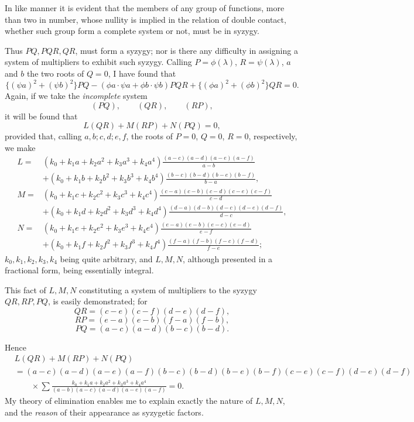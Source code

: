 \documentclass[11pt]{article}
\newcommand{\sourcepage}[1]{\marginpar{\scriptsize p.~#1}}
\begin{document}
In like manner it is evident that the members of any group of functions, more than two in number, whose nullity is implied in the relation of double contact, whether such group form a complete system or not, must be in syzygy.

Thus $PQ,PQR,QR$, must form a syzygy; nor is there any difficulty in assigning a system of multipliers to exhibit such syzygy. Calling $P=\phi(\lambda)$, $R=\psi(\lambda)$, $a$ and $b$ the two roots of $Q=0$, I have found that
\[
\{(\psi a)^2+(\psi b)^2\}PQ-(\phi a\cdot\psi a+\phi b\cdot\psi b)PQR+\{(\phi a)^2+(\phi b)^2\}QR=0.
\]
Again, if we take the \emph{incomplete} system
\[
(PQ),\qquad (QR),\qquad (RP),
\]
it will be found that
\[
L(QR)+M(RP)+N(PQ)=0,
\]
provided that, calling $a,b;c,d;e,f$, the roots of $P=0$, $Q=0$, $R=0$, respectively, we make
\[
\begin{aligned}
L={}&(k_0+k_1a+k_2a^2+k_3a^3+k_4a^4)
\frac{(a-c)(a-d)(a-e)(a-f)}{a-b}\\
&+(k_0+k_1b+k_2b^2+k_3b^3+k_4b^4)
\frac{(b-c)(b-d)(b-e)(b-f)}{b-a},\\
M={}&(k_0+k_1c+k_2c^2+k_3c^3+k_4c^4)
\frac{(c-a)(c-b)(c-d)(c-e)(c-f)}{c-d}\\
&+(k_0+k_1d+k_2d^2+k_3d^3+k_4d^4)
\frac{(d-a)(d-b)(d-c)(d-e)(d-f)}{d-c},\\
N={}&(k_0+k_1e+k_2e^2+k_3e^3+k_4e^4)
\frac{(e-a)(e-b)(e-c)(e-d)}{e-f}\\
&+(k_0+k_1f+k_2f^2+k_3f^3+k_4f^4)
\frac{(f-a)(f-b)(f-c)(f-d)}{f-e};
\end{aligned}
\]
$k_0,k_1,k_2,k_3,k_4$ being quite arbitrary, and $L,M,N$, although presented in a fractional form, being essentially integral.

This fact of $L,M,N$ constituting a system of multipliers to the syzygy $QR,RP,PQ$, is easily demonstrated; for
\[
QR=(c-e)(c-f)(d-e)(d-f),
\]
\[
RP=(e-a)(e-b)(f-a)(f-b),
\]
\[
PQ=(a-c)(a-d)(b-c)(b-d).
\]

\sourcepage{133}
Hence
\[
\begin{aligned}
&L(QR)+M(RP)+N(PQ)\\
&=(a-c)(a-d)(a-e)(a-f)(b-c)(b-d)(b-e)(b-f)(c-e)(c-f)(d-e)(d-f)\\
&\qquad{}\times
\sum \frac{k_0+k_1a+k_2a^2+k_3a^3+k_4a^4}
{(a-b)(a-c)(a-d)(a-e)(a-f)}=0.
\end{aligned}
\]
My theory of elimination enables me to explain exactly the nature of $L,M,N$, and the \emph{reason} of their appearance as syzygetic factors.
\end{document}
